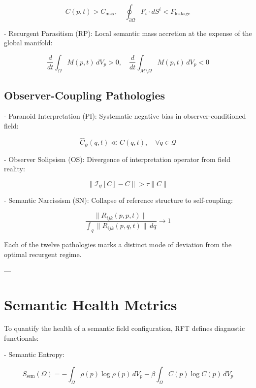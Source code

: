 \begin{equation}
C(p,t) > C_{\text{max}}, \quad \oint_{\partial \Omega} F_i \cdot dS^i < F_{\text{leakage}}
\end{equation}

- Recurgent Parasitism (RP): Local semantic mass accretion at the expense of the global manifold:

\begin{equation}
\frac{d}{dt}\int_{\Omega} M(p,t) \, dV_p > 0, \quad \frac{d}{dt}\int_{\mathcal{M}\setminus\Omega} M(p,t) \, dV_p < 0
\end{equation}

\subsection{Observer-Coupling Pathologies}

- Paranoid Interpretation (PI): Systematic negative bias in observer-conditioned field:

\begin{equation}
\hat{C}_{\psi}(q,t) \ll C(q,t), \quad \forall q \in \mathcal{Q}
\end{equation}

- Observer Solipsism (OS): Divergence of interpretation operator from field reality:

\begin{equation}
\|\mathcal{I}_{\psi}[C] - C\| > \tau \|C\|
\end{equation}

- Semantic Narcissism (SN): Collapse of reference structure to self-coupling:

\begin{equation}
\frac{\|R_{ijk}(p,p,t)\|}{\int_q \|R_{ijk}(p,q,t)\| \, dq} \to 1
\end{equation}

Each of the twelve pathologies marks a distinct mode of deviation from the optimal recurgent regime.

---

\section{Semantic Health Metrics}

To quantify the health of a semantic field configuration, RFT defines diagnostic functionals:

- Semantic Entropy:

\begin{equation}
S_{\text{sem}}(\Omega) = -\int_{\Omega} \rho(p) \log\rho(p) \, dV_p - \beta \int_{\Omega} C(p) \log C(p) \, dV_p
\end{equation}

